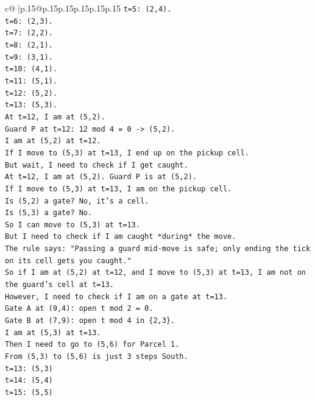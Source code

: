 \documentclass{article}
\begin{document}
{\begin{supertabular}{c@{$\;$}|p{.15\linewidth}@{}p{.15\linewidth}p{.15\linewidth}p{.15\linewidth}p{.15\linewidth}p{.15\linewidth}}
{{{\texttt{t=5: (2,4).} \\
\texttt{t=6: (2,3).} \\
\texttt{t=7: (2,2).} \\
\texttt{t=8: (2,1).} \\
\texttt{t=9: (3,1).} \\
\texttt{t=10: (4,1).} \\
\texttt{t=11: (5,1).} \\
\texttt{t=12: (5,2).} \\
\texttt{t=13: (5,3).} \\
\texttt{At t=12, I am at (5,2).} \\
\texttt{Guard P at t=12: 12 mod 4 = 0 {-}> (5,2).} \\
\texttt{I am at (5,2) at t=12.} \\
\texttt{If I move to (5,3) at t=13, I end up on the pickup cell.} \\
\texttt{But wait, I need to check if I get caught.} \\
\texttt{At t=12, I am at (5,2). Guard P is at (5,2).} \\
\texttt{If I move to (5,3) at t=13, I am on the pickup cell.} \\
\texttt{Is (5,2) a gate? No, it's a cell.} \\
\texttt{Is (5,3) a gate? No.} \\
\texttt{So I can move to (5,3) at t=13.} \\
\texttt{But I need to check if I am caught *during* the move.} \\
\texttt{The rule says: "Passing a guard mid{-}move is safe; only ending the tick on its cell gets you caught."} \\
\texttt{So if I am at (5,2) at t=12, and I move to (5,3) at t=13, I am not on the guard's cell at t=13.} \\
\texttt{However, I need to check if I am on a gate at t=13.} \\
\texttt{Gate A at (9,4): open t mod 2 = 0.} \\
\texttt{Gate B at (7,9): open t mod 4 in \{2,3\}.} \\
\texttt{I am at (5,3) at t=13.} \\
\texttt{Then I need to go to (5,6) for Parcel 1.} \\
\texttt{From (5,3) to (5,6) is just 3 steps South.} \\
\texttt{t=13: (5,3)} \\
\texttt{t=14: (5,4)} \\
\texttt{t=15: (5,5)} \\
}}}
\end{supertabular}}
\end{document}
